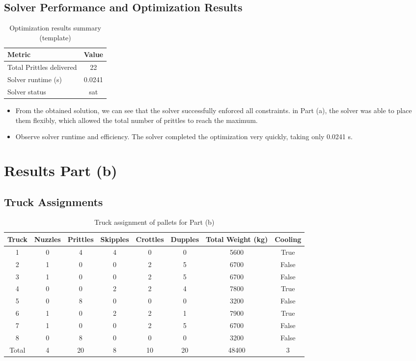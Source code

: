 \documentclass{article}
\begin{document}
\subsection{Solver Performance and Optimization Results}

\begin{table}[H]
\centering
\caption{Optimization results summary (template)}
\begin{tabular}{l c}
\toprule
Metric & Value \\
\midrule
Total Prittles delivered & 22 \\
Solver runtime (s) & 0.0241 \\
Solver status & sat \\
\bottomrule
\end{tabular}
\end{table}

\begin{itemize}
    \item
    From the obtained solution, we can see that the solver successfully enforced all constraints. in Part (a), the solver was able to place them flexibly, which allowed the total number of prittles to reach the maximum.
    
    \item Observe solver runtime and efficiency.  
    The solver completed the optimization very quickly, taking only 0.0241 s.
\end{itemize}



\section{Results Part (b)}

\subsection{Truck Assignments}

\begin{table}[H]
\centering
\caption{Truck assignment of pallets for Part (b)}
\small
\begin{tabular}{c|ccccc|c|c}
\toprule
Truck & Nuzzles & Prittles & Skipples & Crottles & Dupples & Total Weight (kg) & Cooling \\
\midrule
1 & 0 & 4 & 4 & 0 & 0 & 5600 & True \\
2 & 1 & 0 & 0 & 2 & 5 & 6700 & False \\
3 & 1 & 0 & 0 & 2 & 5 & 6700 & False \\
4 & 0 & 0 & 2 & 2 & 4 & 7800 & True \\
5 & 0 & 8 & 0 & 0 & 0 & 3200 & False \\
6 & 1 & 0 & 2 & 2 & 1 & 7900 & True \\
7 & 1 & 0 & 0 & 2 & 5 & 6700 & False \\
8 & 0 & 8 & 0 & 0 & 0 & 3200 & False \\
\midrule
Total & 4 & 20 & 8 & 10 & 20 & 48400 & 3 \\
\bottomrule
\end{tabular}
\end{table}
\end{document}
